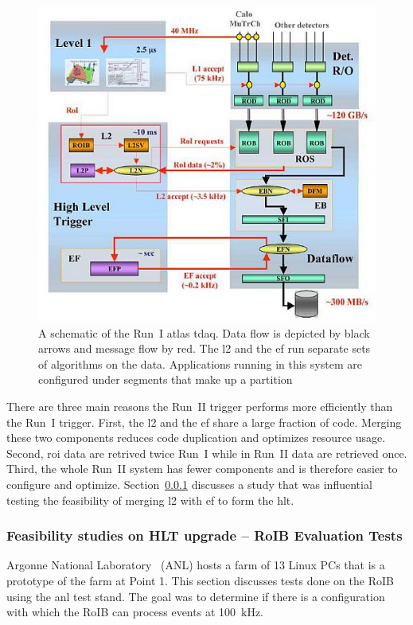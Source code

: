 \begin{figure}[!h]
\centering
\includegraphics[width=0.8\linewidth]{figures/current_trig}
\caption{A schematic of the Run~I \acrshort{atlas} \acrshort{tdaq}. Data flow is depicted by black arrows and message flow by red. The \acrshort{l2} and the \acrshort{ef} run separate sets of algorithms on the data. Applications running in this system are configured under segments that make up a partition}
\label{trig_cur}
\end{figure}

\par There are three main reasons the Run~II trigger performs more efficiently than 
the Run~I trigger. First, the \acrshort{l2} and the \acrshort{ef} share a large fraction of code.
 Merging these two components reduces code duplication and optimizes resource usage. 
Second, \acrshort{roi} data are retrived twice Run~I while in Run~II data are retrieved once.
Third, the whole Run~II system has fewer components and is therefore easier to configure and optimize.
Section~\ref{sec:anlL2} discusses a study that was influential testing the feasibility of merging 
\acrshort{l2} with \acrshort{ef} to form the \acrshort{hlt}.

\subsubsection{Feasibility studies on HLT upgrade -- RoIB Evaluation Tests}
\label{sec:anlL2}

\par Argonne National Laboratory~\cite{anl} (ANL) hosts a farm of 13 Linux PCs that is a prototype 
of the farm at Point 1. This section discusses tests done on the RoIB using 
the \acrshort{anl} test stand. The goal was to determine if there is a configuration with 
which the RoIB can process events at \SI{100}{\kilo\hertz}. 


